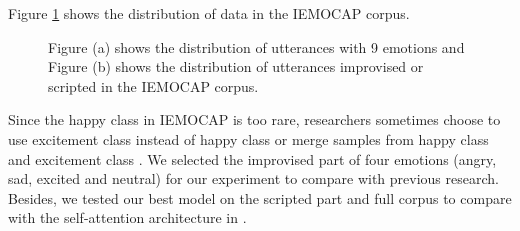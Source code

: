 \documentclass[10pt, conference, compsocconf]{IEEEtran}
\begin{document}
Figure \ref{dataDistribution} shows the distribution of data in the IEMOCAP corpus.

\begin{figure}[h]
	
	\centering
	\subfigcapskip=5pt
	\caption{Figure (a) shows the distribution of utterances with 9 emotions and Figure (b) shows the distribution of utterances improvised or scripted in the IEMOCAP corpus.}
	\label{dataDistribution}
	
\end{figure}
Since the happy class in IEMOCAP is too rare, researchers sometimes choose to use excitement class instead of happy class \cite{tarantino2019self,chernykh2017emotion} or merge samples from happy class and excitement class \cite{zhao2019attention,neumann2019improving}. We selected the improvised part of four emotions (angry, sad, excited and neutral) for our experiment to compare with previous research. Besides, we
tested our best model on the scripted part and full corpus to compare with the self-attention architecture in \cite{tarantino2019self}.
\end{document}
